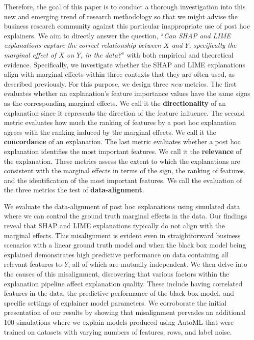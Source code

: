 \documentclass[mnsc,blindrev]{informs3}
\begin{document}
Therefore, the goal of this paper is to conduct a thorough investigation into this new and emerging trend of research methodology so that we might advise the business research community
against this particular inappropriate use of post hoc explainers. We aim to directly answer the question, %
``\emph{Can SHAP and LIME explanations capture the correct relationship between $X$ and $Y$, specifically the marginal effect of $X$ on $Y$, in the data?}''
with both empirical and theoretical evidence.  Specifically, we investigate whether the SHAP and LIME explanations align with marginal effects within three contexts that they are often used, as described previously. For this purpose, we design three \textit{new} metrics. The first evaluates whether an explanation's feature importance values have the same signs as the corresponding marginal effects. We call it the \textbf{directionality} of an explanation since it represents the direction of the feature influence. The second metric evaluates how much the ranking of features by a post hoc explanation agrees with the ranking induced by the marginal effects. We call it the \textbf{concordance} of an explanation. The last metric evaluates whether a post hoc explanation identifies the most important features. We call it the \textbf{relevance} of the explanation. These metrics assess the extent to which the explanations are consistent with the marginal effects in terms of the sign, the ranking of features, and the identification of the most important features. We call the evaluation of the three metrics the test of \textbf{data-alignment}.

We evaluate the data-alignment of post hoc explanations using simulated data where we can control the ground truth marginal effects in the data. Our findings reveal that SHAP and LIME explanations typically do not align with the marginal effects. This misalignment is evident even in straightforward business scenarios with a linear ground truth model and when the black box model being explained demonstrates high predictive performance on data containing all relevant features to $Y$, all of which are mutually independent. We then delve into the causes of this misalignment, discovering that various factors within the explanation pipeline affect explanation quality. These include having correlated features in the data, the predictive performance of the black box model, and specific settings of explainer model parameters. We corroborate the initial presentation of our results by showing that misalignment pervades an additional 100 simulations where we explain models produced using AutoML that were trained on datasets with varying numbers of features, rows, and label noise.
\end{document}
